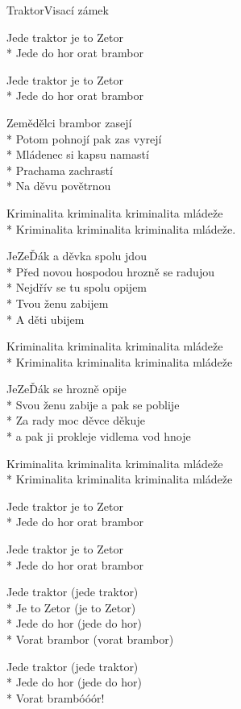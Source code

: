 \documentclass[10.5pt]{book}
\begin{document}
\begin{poem}{Traktor}{Visací zámek}

\settowidth{\versewidth}{Sám s hlavou skloněnou, všechny lásky budou zdání.}

Jede traktor je to Zetor\\*
Jede do hor orat brambor

Jede traktor je to Zetor\\*
Jede do hor orat brambor

Zemědělci brambor zasejí\\*
Potom pohnojí pak zas vyrejí\\*
Mládenec si kapsu namastí\\*
Prachama zachrastí\\*
Na děvu povětrnou

Kriminalita kriminalita kriminalita mládeže\\*
Kriminalita kriminalita kriminalita mládeže.

JeZeĎák a děvka spolu jdou\\*
Před novou hospodou hrozně se radujou\\*
Nejdřív se tu spolu opijem\\*
Tvou ženu zabijem\\*
A děti ubijem

Kriminalita kriminalita kriminalita mládeže\\*
Kriminalita kriminalita kriminalita mládeže

JeZeĎák se hrozně opije\\*
Svou ženu zabije a pak se poblije\\*
Za rady moc děvce děkuje\\*
a pak ji prokleje vidlema vod hnoje

Kriminalita kriminalita kriminalita mládeže\\*
Kriminalita kriminalita kriminalita mládeže

Jede traktor je to Zetor\\*
Jede do hor orat brambor

Jede traktor je to Zetor\\*
Jede do hor orat brambor

Jede traktor (jede traktor)\\*
Je to Zetor (je to Zetor)\\*
Jede do hor (jede do hor)\\*
Vorat brambor (vorat brambor)

Jede traktor (jede traktor)\\*
Jede do hor (jede do hor)\\*
Vorat brambóóór!

\end{poem}
\end{document}
